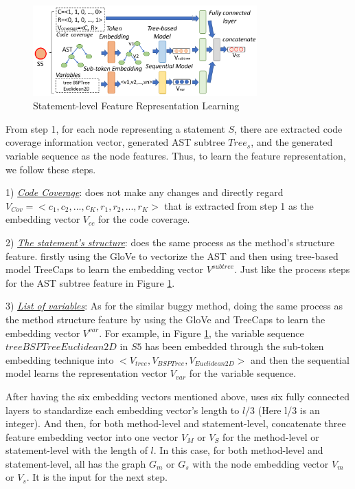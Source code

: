 \begin{figure}[t]
	\centering
	\includegraphics[width=3.4in]{graphs/step-2-statement-new.png}
	\caption{Statement-level Feature Representation Learning}
	\label{statement-level-feature-learning}
\end{figure}

From step 1, for each node representing a statement $S$, there are extracted code coverage information vector, generated AST subtree $Tree_s$, and the generated variable sequence as the node features. Thus, to learn the feature representation, we follow these steps.

1) {\em \underline{Code Coverage}}: \tool does not make any changes and directly regard $V_{Cov} = <c_1, c_2, ...,
c_K, r_1, r_2, ..., r_K>$ that is extracted from step 1 as the embedding vector $V_{cc}$ for the code coverage. 

2) {\em \underline{The statement's structure}}: \tool does the same process as the method's structure feature. \tool firstly using the GloVe to vectorize the AST and then using tree-based model TreeCaps to learn the embedding vector $V^{subtree}$. Just like the process steps for the AST subtree feature in Figure \ref{statement-level-feature-learning}.

3) {\em \underline{List of variables}}: As for the similar buggy method, \tool doing the same process as the method structure feature by using the GloVe and TreeCaps to learn the embedding vector $V^{var}$. For example, in Figure \ref{statement-level-feature-learning}, the variable sequence $tree BSPTree Euclidean2D$ in $S5$ has been embedded through the sub-token embedding technique into $<V_{tree}, V_{BSPTree}, V_{Euclidean2D}>$ and then the sequential model learns the representation vector $V_{var}$ for the variable sequence. 

After having the six embedding vectors mentioned above, \tool uses six fully connected layers to standardize each embedding vector's length to $l/3$ (Here l/3 is an integer). And then, for both method-level and statement-level, \tool concatenate three feature embedding vector into one vector $V_{M}$ or $V_{S}$ for the method-level or statement-level with the length of $l$. In this case, for both method-level and statement-level, \tool all has the graph $G_m$ or $G_s$ with the node embedding vector $V_{m}$ or $V_{s}$. It is the input for the next step.
